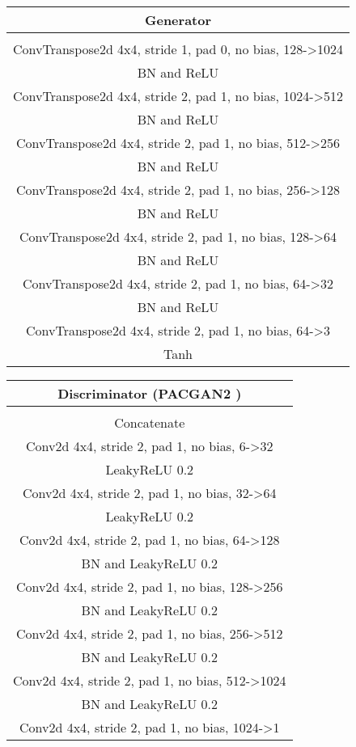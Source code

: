 \documentclass{article}
\begin{document}
\begin{tabular}{c}
	Generator \\
	\toprule\midrule
	 \\
	\midrule
	ConvTranspose2d 4x4, stride 1, pad 0, no bias, 128->1024 \\
	\midrule
	BN and ReLU \\
	\midrule
	ConvTranspose2d 4x4, stride 2, pad 1, no bias, 1024->512 \\
	\midrule
	BN and ReLU \\
	\midrule
	ConvTranspose2d 4x4, stride 2, pad 1, no bias, 512->256 \\
	\midrule
	BN and ReLU \\
	\midrule
	ConvTranspose2d 4x4, stride 2, pad 1, no bias, 256->128 \\
	\midrule
	BN and ReLU \\
	\midrule
	ConvTranspose2d 4x4, stride 2, pad 1, no bias, 128->64 \\
	\midrule
	BN and ReLU \\
	\midrule
	ConvTranspose2d 4x4, stride 2, pad 1, no bias, 64->32 \\
	\midrule
	BN and ReLU \\
	\midrule
	ConvTranspose2d 4x4, stride 2, pad 1, no bias, 64->3 \\
	\midrule
	Tanh \\
	\bottomrule
\end{tabular} 
\quad
\begin{tabular}{c}
	Discriminator (PACGAN2 \citep{pacgan}) \\
	\toprule\midrule
	 \\
	\midrule
	Concatenate  \\
	\midrule
	Conv2d 4x4, stride 2, pad 1, no bias, 6->32 \\
	\midrule
	LeakyReLU 0.2 \\
	\midrule
	Conv2d 4x4, stride 2, pad 1, no bias, 32->64 \\
	\midrule
	LeakyReLU 0.2 \\
	\midrule
	Conv2d 4x4, stride 2, pad 1, no bias, 64->128 \\
	\midrule
	BN and LeakyReLU 0.2 \\
	\midrule
	Conv2d 4x4, stride 2, pad 1, no bias, 128->256 \\
	\midrule
	BN and LeakyReLU 0.2 \\
	\midrule
	Conv2d 4x4, stride 2, pad 1, no bias, 256->512 \\
	\midrule
	BN and LeakyReLU 0.2 \\
	\midrule
	Conv2d 4x4, stride 2, pad 1, no bias, 512->1024 \\
	\midrule
	BN and LeakyReLU 0.2 \\
	\midrule
	Conv2d 4x4, stride 2, pad 1, no bias, 1024->1 \\
	\bottomrule
\end{tabular}
\end{document}
